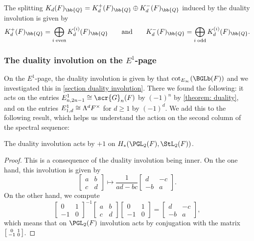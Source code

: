 \documentclass[a4paper]{amsart}
\begin{document}
\begin{lemma} \label{lem:involution-vs-weight}
    The splitting $K_d(F)_\bb{Q}= K_d^+(F)_\bb{Q} \oplus K_d^-(F)_\bb{Q}$ induced by the duality involution is given by
    \[K_d^+(F)_\bb{Q}= \bigoplus_{i \; \text{even}} K^{(i)}_d(F)_\bb{Q} \qquad \text{and} \qquad K_d^-(F)_\bb{Q}= \bigoplus_{i \; \text{odd}} K^{(i)}_d(F)_\bb{Q}.\]
\end{lemma}

\subsubsection{The duality involution on the $E^1$-page}
On the $E^1$-page, the duality involution is given by that $\cot_{E_\infty}(\BGLb(F))$ and we investigated this in \cref{section duality involution}. There we found the following: it acts on the entries $E^1_{n,2n-1} \cong \scr{G}_n(F)$ by $(-1)^n$ by \cref{theorem: duality}, and on the entries $\smash{E^1_{1,d}} \cong \smash{\Lambda^d F^\times}$ for $d \ge 1$ by $(-1)^d$. We add this to the following result, which helps us understand the action on the second column of the spectral sequence:

\begin{lemma}
    The duality involution acts by $+1$ on $H_*(\PGL_2(F),\StL_2(F))$. 
\end{lemma}

\begin{proof}This is a consequence of the duality involution being inner. On the one hand, this involution is given by
\[\begin{bmatrix}
        a & b \\ c & d
    \end{bmatrix} \longmapsto \frac{1}{ad-bc}\begin{bmatrix} d & -c \\ -b & a
    \end{bmatrix}.\]
On the other hand, we compute
    \[\begin{bmatrix}
        0 & 1 \\ -1 & 0
    \end{bmatrix}^{-1} \begin{bmatrix}
        a & b \\ c & d
    \end{bmatrix} \begin{bmatrix}
        0 & 1 \\ -1 & 0
    \end{bmatrix} = \begin{bmatrix} d & -c \\ -b & a
    \end{bmatrix},\]
    which means that on $\PGL_2(F)$ involution acts by conjugation with the matrix 
    $\begin{bsmallmatrix}
        0 & 1 \\ -1 & 0
    \end{bsmallmatrix}$.\end{proof}
\end{document}
